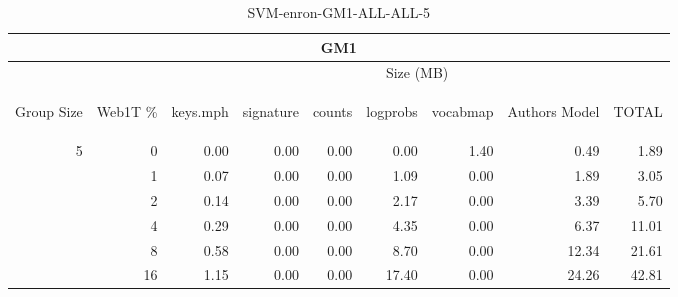 \begin{center}
\begin{table}[htbp] 
 \begin{center}
\begin{tabular}{ | r | r | r | r | r | r | r | r | r |}
\hline
\multicolumn{9}{|c|}{GM1}\\
\hline
 & & \multicolumn{7}{|c|}{Size (MB)}\\ \cline{3-9}
\begin{sideways}Group Size\end{sideways} & \begin{sideways}Web1T \% \end{sideways} & \begin{sideways}keys.mph\end{sideways} & \begin{sideways}signature\end{sideways} & \begin{sideways}counts\end{sideways} & \begin{sideways}logprobs\end{sideways} & \begin{sideways}vocabmap\end{sideways} & \begin{sideways}Authors Model \end{sideways} & \begin{sideways}TOTAL\end{sideways}\\
\hline
\multirow{5}{*}{5}
 & 0 & 0.00 & 0.00 & 0.00 & 0.00 & 1.40 & 0.49 & 1.89\\ \cline{2-9}
 & 1 & 0.07 & 0.00 & 0.00 & 1.09 & 0.00 & 1.89 & 3.05\\ \cline{2-9}
 & 2 & 0.14 & 0.00 & 0.00 & 2.17 & 0.00 & 3.39 & 5.70\\ \cline{2-9}
 & 4 & 0.29 & 0.00 & 0.00 & 4.35 & 0.00 & 6.37 & 11.01\\ \cline{2-9}
 & 8 & 0.58 & 0.00 & 0.00 & 8.70 & 0.00 & 12.34 & 21.61\\ \cline{2-9}
 & 16 & 1.15 & 0.00 & 0.00 & 17.40 & 0.00 & 24.26 & 42.81\\ \cline{2-9}
\hline
\end{tabular}
\caption{SVM-enron-GM1-ALL-ALL-5}
\label{table:SVM-enron-GM1-ALL-ALL-5}
\end{center}
 \end{table}
\end{center}

